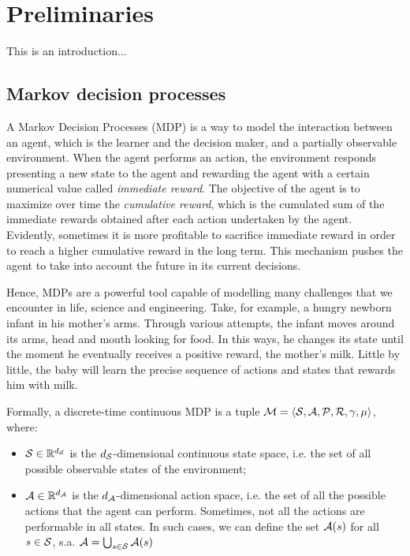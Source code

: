 
\chapter{Preliminaries}
This is an introduction...

\section{Markov decision processes}
A Markov Decision Processes (MDP) is a way to model the interaction between an agent, which is the learner and the decision maker, and a partially observable environment. When the agent performs an action, the environment responds presenting a new state to the agent and rewarding the agent with a certain numerical value called \emph{immediate reward}. The objective of the agent is to maximize over time the  \emph{cumulative reward}, which is the cumulated sum of the immediate rewards obtained after each action undertaken by the agent. Evidently, sometimes it is more profitable to sacrifice immediate reward in order to reach a higher cumulative reward in the long term. This mechanism pushes the agent to take into account the future in its current decisions. 

Hence, MDPs are a powerful tool capable of modelling many challenges that we encounter in life, science and engineering. Take, for example, a hungry newborn infant in his mother's arms. Through various attempts, the infant moves around its arms, head and mouth looking for food. In this ways, he changes its state until the moment he eventually receives a positive reward, the mother's milk. Little by little, the baby will learn the precise sequence of actions and states that rewards him with milk.

Formally, a discrete-time continuous MDP \cite{puterman2014markov} is a tuple $\mathcal{M} = \langle\mathcal{S},\mathcal{A},\mathcal{P},\mathcal{R},\gamma,\mu\rangle$, where:

\begin{itemize}
\item $\mathcal{S}\in\mathbb{R}^{d_{\mathcal{S}}}$ is the $d_{\mathcal{S}}$-dimensional continuous state space, i.e. the set of all possible observable states of the environment;
\item $\mathcal{A}\in\mathbb{R}^{d_{\mathcal{A}}}$ is the $d_{\mathcal{A}}$-dimensional action space, i.e. the set of all the possible actions that the agent can perform. Sometimes, not all the actions are performable in all states. In such cases, we can define the set $\mathcal{A}(s)$ for all $s \in \mathcal{S}$, s.a.  $\mathcal{A} = \bigcup_{s \in \mathcal{S}} \mathcal{A}(s)$ 

\end{itemize}


